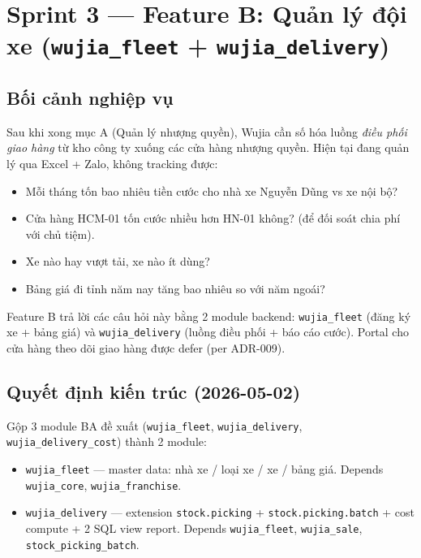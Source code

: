 \chapter{Sprint 3 --- Feature B: Quản lý đội xe (\texttt{wujia\_fleet} + \texttt{wujia\_delivery})}

\section{Bối cảnh nghiệp vụ}

Sau khi xong mục A (Quản lý nhượng quyền), Wujia cần số hóa luồng \emph{điều phối giao hàng} từ kho công ty xuống các cửa hàng nhượng quyền. Hiện tại đang quản lý qua Excel + Zalo, không tracking được:

\begin{itemize}
    \item Mỗi tháng tốn bao nhiêu tiền cước cho nhà xe Nguyễn Dũng vs xe nội bộ?
    \item Cửa hàng HCM-01 tốn cước nhiều hơn HN-01 không? (để đối soát chia phí với chủ tiệm).
    \item Xe nào hay vượt tải, xe nào ít dùng?
    \item Bảng giá đi tỉnh năm nay tăng bao nhiêu so với năm ngoái?
\end{itemize}

Feature B trả lời các câu hỏi này bằng 2 module backend: \texttt{wujia\_fleet} (đăng ký xe + bảng giá) và \texttt{wujia\_delivery} (luồng điều phối + báo cáo cước). Portal cho cửa hàng theo dõi giao hàng được defer (per ADR-009).

\section{Quyết định kiến trúc (2026-05-02)}

Gộp 3 module BA đề xuất (\texttt{wujia\_fleet}, \texttt{wujia\_delivery}, \texttt{wujia\_delivery\_cost}) thành 2 module:

\begin{itemize}
    \item \texttt{wujia\_fleet} --- master data: nhà xe / loại xe / xe / bảng giá. Depends \texttt{wujia\_core}, \texttt{wujia\_franchise}.
    \item \texttt{wujia\_delivery} --- extension \texttt{stock.picking} + \texttt{stock.picking.batch} + cost compute + 2 SQL view report. Depends \texttt{wujia\_fleet}, \texttt{wujia\_sale}, \texttt{stock\_picking\_batch}.
\end{itemize}


